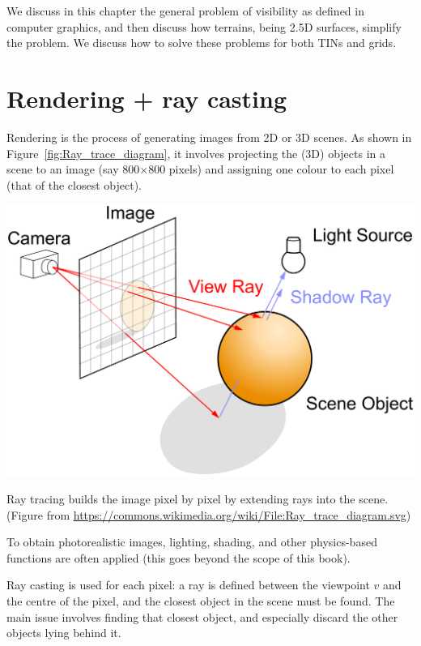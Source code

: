 %

We discuss in this chapter the general problem of visibility as defined in computer graphics, and then discuss how terrains, being 2.5D surfaces, simplify the problem.
We discuss how to solve these problems for both TINs and grids.


%
\section{Rendering + ray casting}

Rendering is the process of generating images from 2D or 3D scenes.
As shown in Figure~\ref{fig:Ray_trace_diagram}, it involves projecting the (3D) objects in a scene to an image (say 800$\times$800 pixels) and assigning one colour to each pixel (that of the closest object).
\begin{marginfigure}
  \centering
  \includegraphics[width=\linewidth]{Ray_trace_diagram.pdf}
  \caption{Ray tracing builds the image pixel by pixel by extending rays into the scene. (Figure from \url{https://commons.wikimedia.org/wiki/File:Ray_trace_diagram.svg})}%
\label{fig:Ray_trace_diagram}
\end{marginfigure}
To obtain photorealistic images, lighting, shading, and other physics-based functions are often applied (this goes beyond the scope of this book).

%

Ray casting is used for each pixel: a ray is defined between the viewpoint $v$ and the centre of the pixel, and the closest object in the scene must be found.
The main issue involves finding that closest object, and especially discard the other objects lying behind it.

